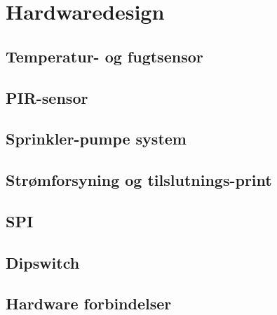 \chapter{Hardwaredesign}

\section{Temperatur- og fugtsensor}


\section{PIR-sensor}


\section{Sprinkler-pumpe system}


\section{Strømforsyning og tilslutnings-print}


\section{SPI}


\section{Dipswitch}


\section{Hardware forbindelser}
